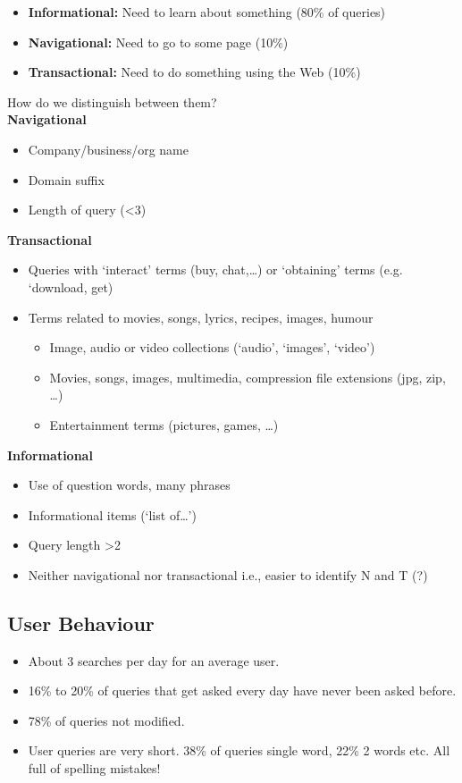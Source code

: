 \documentclass[11pt]{article}
\begin{document}
\begin{itemize}
    \item \textbf{Informational:} Need to learn about something (80\% of queries)
    \item \textbf{Navigational:} Need to go to some page (10\%)
    \item \textbf{Transactional:} Need to do something using the Web (10\%)
\end{itemize}
How do we distinguish between them?\\
\newline
\textbf{Navigational}
\begin{itemize}
    \item Company/business/org name
    \item Domain suffix
    \item Length of query (\textless3)
\end{itemize}
\newpage
\textbf{Transactional}
\begin{itemize}
    \item Queries with ‘interact’ terms (buy, chat,…) or ‘obtaining’ terms
(e.g. ‘download, get)
    \item Terms related to movies, songs, lyrics, recipes, images, humour
    \begin{itemize}
        \item Image, audio or video collections (‘audio’, ‘images’, ‘video’)
        \item Movies, songs, images, multimedia, compression file extensions
(jpg, zip, …)
        \item Entertainment terms (pictures, games, …)
    \end{itemize}
\end{itemize}
\textbf{Informational}
\begin{itemize}
    \item Use of question words, many phrases
    \item Informational items (‘list of…’)
    \item Query length \textgreater2
    \item Neither navigational nor transactional i.e., easier to identify
N and T (?)
\end{itemize}
\subsection{User Behaviour}
\begin{itemize}
    \item About 3 searches per day for an average user.
    \item 16\% to 20\% of queries that get asked every day have
    never been asked before.
    \item 78\% of queries not modified.
    \item User queries are very short. 38\% of queries single word, 22\% 2 words etc. All full of spelling mistakes!
\end{itemize}
\end{document}
